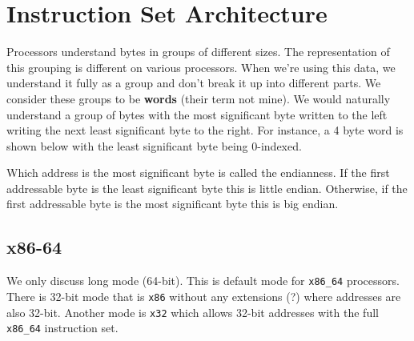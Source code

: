 \chapter{Instruction Set Architecture}

Processors understand bytes in groups of different sizes. The representation of
this grouping is different on various processors. When we're using this data, we
understand it fully as a group and don't break it up into different parts. We
consider these groups to be \textbf{words} (their term not mine). We would
naturally understand a group of bytes with the most significant byte written to
the left writing the next least significant byte to the right. For instance, a 4
byte word is shown below with the least significant byte being 0-indexed.

Which address is the most significant byte is called the endianness. If the
first addressable byte is the least significant byte this is little endian.
Otherwise, if the first addressable byte is the most significant byte this is
big endian.

\begin{center}
\end{center}

\section{x86-64}

We only discuss long mode (64-bit).
This is default mode for \texttt{x86\_64} processors.
There is 32-bit mode that is \texttt{x86} without any extensions (?) where
addresses are also 32-bit.
Another mode is \texttt{x32} which allows 32-bit addresses with the full
\texttt{x86\_64} instruction set.

